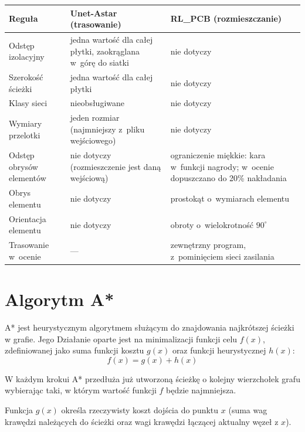 \begin{table}[ht]
\label{tab:reguly-ai}
\centering\footnotesize%
\begin{tabular}{p{} p{} p{}}
\toprule
Reguła & Unet-Astar (trasowanie) & RL\_PCB (rozmieszczanie) \\
\midrule
Odstęp izolacyjny & jedna wartość dla całej płytki, zaokrąglana w~górę do
  siatki & nie dotyczy \\
  \midrule
Szerokość ścieżki & jedna wartość dla całej płytki & nie dotyczy \\
\midrule
Klasy sieci & nieobsługiwane & nie dotyczy \\
\midrule
Wymiary przelotki & jeden rozmiar (najmniejszy z~pliku wejściowego) & nie
  dotyczy \\
  \midrule
Odstęp obrysów elementów & nie dotyczy (rozmieszczenie jest daną wejściową)
  & ograniczenie miękkie: kara w~funkcji nagrody; w~ocenie dopuszczano do
  20\% nakładania \\
  \midrule
Obrys elementu & nie dotyczy & prostokąt o~wymiarach elementu \\
\midrule
Orientacja elementu & nie dotyczy & obroty o~wielokrotność $90^\circ$ \\
\midrule
Trasowanie w~ocenie & --- & zewnętrzny program, z~pominięciem sieci zasilania \\
\bottomrule
\end{tabular}
\end{table}

\section{Algorytm A*}
A* jest heurystycznym algorytmem służącym do znajdowania najkrótszej ścieżki w grafie.
Jego Działanie oparte jest na minimalizacji funkcji celu $f(x)$, zdefiniowanej jako 
suma funkcji kosztu
$g(x)$ oraz funkcji heurystycznej $h(x)$:
\begin{equation}
  f(x) = g(x) + h(x)
  \label{eq:astar-f}
\end{equation}

W każdym krokui A* przedłuża już utworzoną ścieżkę o kolejny wierzchołek grafu wybierając taki,
w którym wartość funkcji $f$ będzie najmniejsza.

Funkcja $g(x)$ określa rzeczywisty koszt dojścia do punktu $x$ (suma wag krawędzi należących do ścieżki
oraz wagi krawędzi łączącej aktualny węzeł z $x$).


